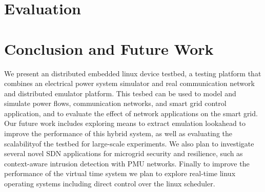 \section{Evaluation}

\section{Conclusion and Future Work}
We present an distributed embedded linux device testbed, a testing platform that combines an
electrical power system simulator and real communication network and distributed emulator platform. This tesbed can be used to model and simulate power flows, communication networks, and smart grid control application, and to evaluate the effect of network applications on the smart grid. Our future work includes
exploring means to extract emulation lookahead to improve
the performance of this hybrid system, as well as evaluating the scalabilityof the testbed for large-scale experiments. We also plan to investigate several novel SDN
applications for microgrid security and resilience, such as context-aware intrusion detection with PMU networks. Finally to improve the performance of the virtual time system we plan to explore real-time linux operating systems including direct control over the linux scheduler.
